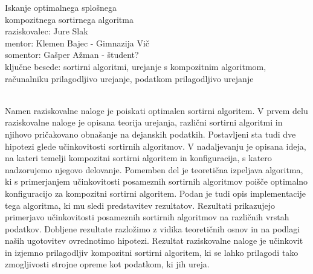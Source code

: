 \documentclass[a4paper,oneside,12pt]{article}
\begin{document}
\begin{center}
  {\huge Iskanje optimalnega splošnega \\ kompozitnega sortirnega algoritma} \\[10mm]
 raziskovalec: Jure Slak \\[5mm]
 mentor: Klemen Bajec - Gimnazija Vič \\[3mm]
 somentor: Gašper Ažman - študent?  \\[5mm]
 ključne besede: sortirni algoritmi, urejanje s kompozitnim algoritmom, računalniku
 prilagodljivo urejanje, podatkom prilagodljivo urejanje 
 \\[10mm]
\end{center} 

{ \\[4mm]}
Namen raziskovalne naloge je poiskati optimalen sortirni algoritem.
V prvem delu raziskovalne naloge je opisana teorija urejanja, različni sortirni
algoritmi in njihovo pričakovano obnašanje na dejanskih podatkih. Postavljeni sta tudi dve 
hipotezi glede učinkovitosti sortirnih algoritmov. 
V nadaljevanju je opisana ideja, na
kateri temelji kompozitni sortirni algoritem in konfiguracija, s katero nadzorujemo
njegovo delovanje. Pomemben del je teoretična izpeljava
algoritma, ki s primerjanjem učinkovitosti posameznih sortirnih algoritmov poišče
optimalno konfiguracijo za kompozitni sortirni algoritem. Podan je tudi opis 
implementacije tega algoritma, ki mu sledi 
predstavitev rezultatov. Rezultati prikazujejo primerjavo učinkovitosti posameznih 
sortirnih algoritmov na različnih vrstah podatkov. 
Dobljene rezultate razložimo z vidika teoretičnih osnov in na podlagi naših ugotovitev 
ovrednotimo hipotezi. Rezultat raziskovalne naloge je učinkovit in izjemno prilagodljiv
kompozitni sortirni algoritem, ki se lahko prilagodi tako zmogljivosti strojne opreme
kot podatkom, ki jih ureja.
\end{document}

